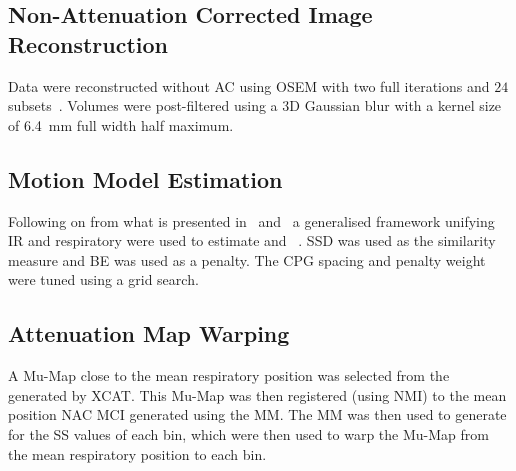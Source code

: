             \subsection{Non-Attenuation Corrected Image Reconstruction} \label{sec:pet_ct_respiratory_motion_correction_with_a_single_attenuation_map_using_nac_derived_deformation_fields_methods_non-attenuation_corrected_image_reconstruction}
                Data were reconstructed without \gls{AC} using \gls{OSEM} with two full iterations and $24$ subsets~.
                Volumes were post-filtered using a \gls{3D} Gaussian blur with a kernel size of \SI{6.4}{\milli\metre} full width half maximum.
            
            \subsection{Motion Model Estimation} \label{sec:pet_ct_respiratory_motion_correction_with_a_single_attenuation_map_using_nac_derived_deformation_fields_methods_motion_model_estimation}
                Following on from what is presented in~ and~ a generalised framework unifying \gls{IR} and respiratory  were used to estimate  and ~. \gls{SSD} was used as the similarity measure and \gls{BE} was used as a penalty. The \gls{CPG} spacing and penalty weight were tuned using a grid search.
            
            \subsection{Attenuation Map Warping} \label{sec:pet_ct_respiratory_motion_correction_with_a_single_attenuation_map_using_nac_derived_deformation_fields_methods_attenuation_map_warping}
                A \gls{Mu-Map} close to the mean respiratory position was selected from the  generated by \gls{XCAT}. This \gls{Mu-Map} was then registered (using \gls{NMI}) to the mean position \gls{NAC} \gls*{MCI} generated using the \gls{MM}. The \gls{MM} was then used to generate  for the \gls{SS} values of each bin, which were then used to warp the \gls{Mu-Map} from the mean respiratory position to each bin.
            
